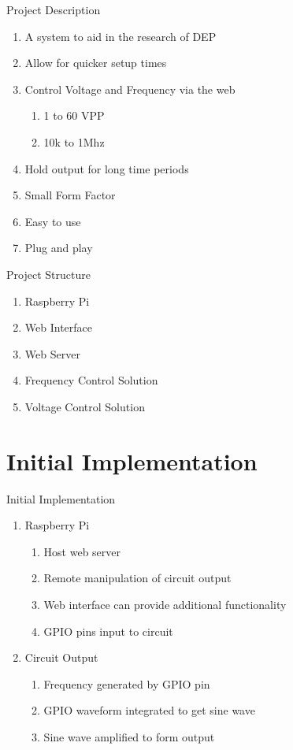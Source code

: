 \begin{frame}{Project Description}
  \begin{enumerate}
    \item A system to aid in the research of DEP
    \item Allow for quicker setup times
    \item Control Voltage and Frequency via the web
      \begin{enumerate}
        \item 1 to 60 VPP
        \item 10k to 1Mhz
      \end{enumerate}
    \item Hold output for long time periods
    \item Small Form Factor
    \item Easy to use
    \item Plug and play
  \end{enumerate}
\end{frame}

\begin{frame}{Project Structure}
  \begin{enumerate}
    \item Raspberry Pi
    \item Web Interface
    \item Web Server
    \item Frequency Control Solution
    \item Voltage Control Solution
  \end{enumerate}
\end{frame}

\section{Initial Implementation}

\begin{frame}{Initial Implementation}
  \begin{enumerate}
    \item Raspberry Pi 
      \begin{enumerate}
        \item Host web server
        \item Remote manipulation of circuit output
        \item Web interface can provide additional functionality
        \item GPIO pins input to circuit
      \end{enumerate}
    \item Circuit Output
      \begin{enumerate}
        \item Frequency generated by GPIO pin 
        \item GPIO waveform integrated to get sine wave
        \item Sine wave amplified to form output
      \end{enumerate}
  \end{enumerate}
\end{frame}

